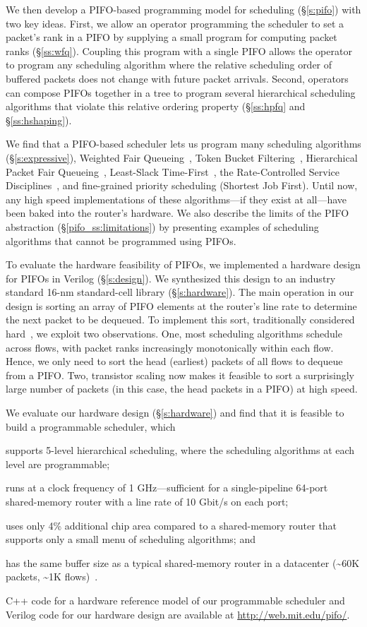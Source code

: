 We then develop a PIFO-based programming model for scheduling (\S\ref{s:pifo})
with two key ideas. First, we allow an operator programming the scheduler to
set a packet's rank in a PIFO by supplying a small program for computing packet
ranks (\S\ref{ss:wfq}).  Coupling this program with a single PIFO allows the
operator to program any scheduling algorithm where the relative scheduling
order of buffered packets does not change with future packet arrivals. Second,
operators can compose PIFOs together in a tree to program several hierarchical
scheduling algorithms that violate this relative ordering property
(\S\ref{ss:hpfq} and \S\ref{ss:hshaping}).

We find that a PIFO-based scheduler lets us program many scheduling algorithms
(\S\ref{s:expressive}), \eg Weighted Fair Queueing~\cite{wfq}, Token Bucket
Filtering~\cite{tbf}, Hierarchical Packet Fair Queueing~\cite{hpfq},
Least-Slack Time-First~\cite{lstf}, the Rate-Controlled Service
Disciplines~\cite{rcsd}, and fine-grained priority scheduling (\eg Shortest Job
First). Until now, any high speed implementations of these algorithms---if they
exist at all---have been baked into the router's hardware. We also describe the
limits of the PIFO abstraction (\S\ref{pifo_ss:limitations}) by presenting
examples of scheduling algorithms that cannot be programmed using PIFOs.

To evaluate the hardware feasibility of PIFOs, we implemented a hardware design
for PIFOs in Verilog (\S\ref{s:design}). We synthesized this design to an
industry standard 16-nm standard-cell library (\S\ref{s:hardware}). The main
operation in our design is sorting an array of PIFO elements at the router's
line rate to determine the next packet to be dequeued. To implement this sort,
traditionally considered hard~\cite{sfq, drr}, we exploit two observations.
One, most scheduling algorithms schedule across flows, with packet ranks
increasingly monotonically within each flow.  Hence, we only need to sort the
head (earliest) packets of all flows to dequeue from a PIFO.  Two, transistor
scaling now makes it feasible to sort a surprisingly large number of packets (in
this case, the head packets in a PIFO) at high speed.

We evaluate our hardware design (\S\ref{s:hardware}) and find that it is
feasible to build a programmable scheduler, which
\begin{CompactItemize}
  \item supports 5-level hierarchical scheduling, where the scheduling
    algorithms at each level are programmable;
  \item runs at a clock frequency of 1 GHz---sufficient for a single-pipeline
    64-port shared-memory router with a line rate of 10 Gbit/s on each port;
  \item uses only 4\% additional chip area compared to a
    shared-memory router that supports only a small menu of scheduling
    algorithms; and
  \item has the same buffer size as a typical shared-memory router
    in a datacenter (\textasciitilde 60K packets, \textasciitilde 1K flows)~\cite{trident2}.
\end{CompactItemize}

 C++ code for a hardware reference model of our programmable scheduler and
Verilog code for our hardware design are available at
\url{http://web.mit.edu/pifo/}.
